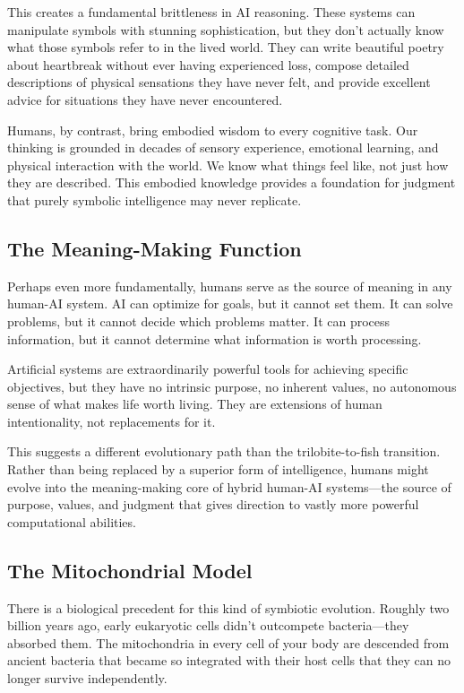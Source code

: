 This creates a fundamental brittleness in AI reasoning. These systems can manipulate symbols with stunning sophistication, but they don't actually know what those symbols refer to in the lived world. They can write beautiful poetry about heartbreak without ever having experienced loss, compose detailed descriptions of physical sensations they have never felt, and provide excellent advice for situations they have never encountered.

Humans, by contrast, bring embodied wisdom to every cognitive task. Our thinking is grounded in decades of sensory experience, emotional learning, and physical interaction with the world. We know what things feel like, not just how they are described. This embodied knowledge provides a foundation for judgment that purely symbolic intelligence may never replicate.

\subsection{The Meaning-Making Function}

Perhaps even more fundamentally, humans serve as the source of meaning in any human-AI system. AI can optimize for goals, but it cannot set them. It can solve problems, but it cannot decide which problems matter. It can process information, but it cannot determine what information is worth processing.

Artificial systems are extraordinarily powerful tools for achieving specific objectives, but they have no intrinsic purpose, no inherent values, no autonomous sense of what makes life worth living. They are extensions of human intentionality, not replacements for it.

This suggests a different evolutionary path than the trilobite-to-fish transition. Rather than being replaced by a superior form of intelligence, humans might evolve into the meaning-making core of hybrid human-AI systems—the source of purpose, values, and judgment that gives direction to vastly more powerful computational abilities.

\subsection{The Mitochondrial Model}

There is a biological precedent for this kind of symbiotic evolution. Roughly two billion years ago, early eukaryotic cells didn't outcompete bacteria—they absorbed them. The mitochondria in every cell of your body are descended from ancient bacteria that became so integrated with their host cells that they can no longer survive independently.

